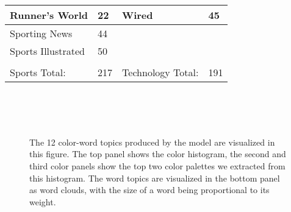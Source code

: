 \documentclass[prodmode,acmtochi]{acmsmall}
\begin{document}
\begin{longtable}[!htb]{|l|l|l|l|}
\cellcolor[HTML]{EFEFEF}Runner's World                       & 22                                           & \cellcolor[HTML]{EFEFEF}Wired                   & 45                                           \\ \hline
\cellcolor[HTML]{EFEFEF}Sporting News                        & 44                                           &                                                 &                                              \\ \hline
\cellcolor[HTML]{EFEFEF}Sports Illustrated                   & 50                                           &                                                 &                                              \\ \hline
                                                             &                                              &                                                 &                                              \\ \hline
\rowcolor[HTML]{EFEFEF}
Sports Total:                                                & 217                                          & Technology Total:                               & 191                                          \\ \hline
\end{longtable}
\normalsize  
\begin{figure}[H]\tiny
  \centering
   \\
   \\
    \\
  \caption{The 12 color-word topics produced by the model are
    visualized in this figure. The top panel shows the color histogram,
    the second and third color panels show the top two color palettes we
    extracted from this histogram. The word topics are visualized in the
    bottom panel as word clouds, with the size of a word being
    proportional to its weight. }
  \label{color-word-topics}
\end{figure}
\end{document}
